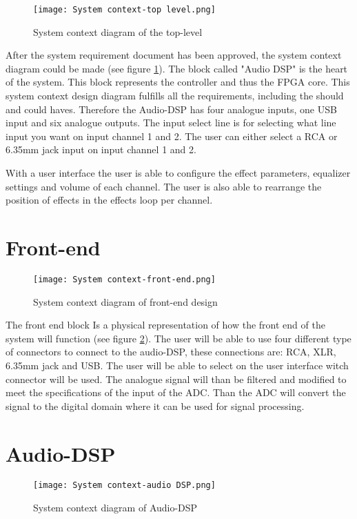 \begin{figure}[ht]
    \texttt{[image: System context-top level.png]}
    \caption{System context diagram of the top-level}
    \label{fig:sys-context-top}
\end{figure}

After the system requirement document has been approved, the system context diagram could be made (see figure \ref{fig:sys-context-top}). The block called "Audio DSP" is the heart of the system. This block represents the controller and thus the FPGA core. This system context design diagram fulfills all the requirements, including the should and could haves. Therefore the Audio-DSP has four analogue inputs, one USB input and six analogue outputs. The input select line is for selecting what line input you want on input channel 1 and 2. The user can either select a RCA or 6.35mm jack input on input channel 1 and 2.

With a user interface the user is able to configure the effect parameters, equalizer settings and volume of each channel. The user is also able to rearrange the position of effects in the effects loop per channel.

\section{Front-end}
\begin{figure}[ht]
    \texttt{[image: System context-front-end.png]}
    \caption{System context diagram of front-end design}
    \label{fig:system-context-front-end}
\end{figure}

The front end block Is a physical representation of how the front end of the system will function (see figure \ref{fig:system-context-front-end}). The user will be able to use four different type of connectors to connect to the audio-DSP, these connections are: RCA, XLR, 6.35mm jack and USB. The user will be able to select on the user interface witch connector will be used. The analogue signal will than be filtered and modified to meet the specifications of the input of the ADC. Than the ADC will convert the signal to the digital domain where it can be used for signal processing. 

\section{Audio-DSP}
\begin{figure}[ht]
    \texttt{[image: System context-audio DSP.png]}
    \caption{System context diagram of Audio-DSP}
    \label{fig:sys-context-audio-dsp}
\end{figure}

